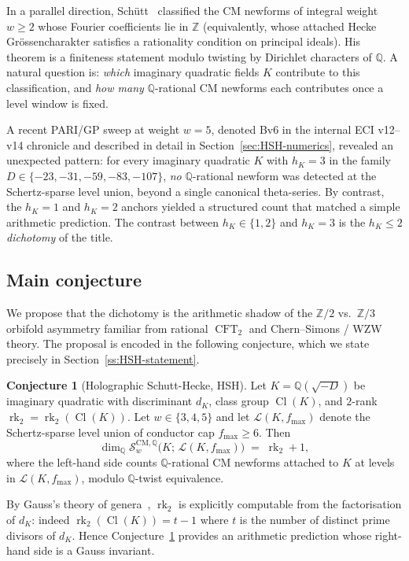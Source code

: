 \documentclass[11pt,a4paper]{amsart}
\theoremstyle{definition}
\newtheorem{conjecture}[theorem]{Conjecture}
\DeclareMathOperator{\Cl}{Cl}
\DeclareMathOperator{\rk}{rk}
\DeclareMathOperator{\CFT}{CFT}
\newcommand{\Q}{\mathbb{Q}}
\newcommand{\Z}{\mathbb{Z}}
\newcommand{\Lcal}{\mathcal{L}}
\newcommand{\Scal}{\mathcal{S}}
\newcommand{\rktwo}{\rk_{2}}
\begin{document}
In a parallel direction, Sch\"utt~\cite{Schutt2009} classified the CM newforms of integral
weight $w \ge 2$ whose Fourier coefficients lie in $\Z$ (equivalently, whose attached
Hecke Gr\"ossencharakter satisfies a rationality condition on principal ideals). His
theorem is a finiteness statement modulo twisting by Dirichlet characters of $\Q$.
A natural question is: \emph{which} imaginary quadratic fields $K$ contribute to this
classification, and \emph{how many} $\Q$-rational CM newforms each contributes once a
level window is fixed.

A recent PARI/GP sweep at weight $w = 5$, denoted Bv6 in the internal ECI v12--v14
chronicle and described in detail in Section~\ref{sec:HSH-numerics}, revealed an
unexpected pattern: for every imaginary quadratic $K$ with $h_K = 3$ in the family
$D \in \{-23,-31,-59,-83,-107\}$, \emph{no} $\Q$-rational newform was detected at the
Schertz-sparse level union, beyond a single canonical theta-series. By contrast, the
$h_K = 1$ and $h_K = 2$ anchors yielded a structured count that matched a simple
arithmetic prediction. The contrast between $h_K \in \{1,2\}$ and $h_K = 3$ is the
\emph{$h_K \le 2$ dichotomy} of the title.

\subsection{Main conjecture}\label{ss:intro-main}

We propose that the dichotomy is the arithmetic shadow of the $\Z/2$ vs.\ $\Z/3$ orbifold
asymmetry familiar from rational $\CFT_2$ and Chern--Simons / WZW theory. The proposal
is encoded in the following conjecture, which we state precisely in
Section~\ref{ss:HSH-statement}.

\begin{conjecture}[Holographic Schutt-Hecke, HSH]\label{conj:HSH-intro}
Let $K = \Q(\sqrt{-D})$ be imaginary quadratic with discriminant $d_K$, class group
$\Cl(K)$, and $2$-rank $\rktwo = \rktwo(\Cl(K))$. Let $w \in \{3,4,5\}$ and let
$\Lcal(K, f_{\max})$ denote the Schertz-sparse level union of conductor cap $f_{\max} \ge 6$.
Then
\[
  \dim_{\Q} \Scal_w^{\mathrm{CM},\Q}\bigl(K;\,\Lcal(K, f_{\max})\bigr) \;=\; \rktwo + 1,
\]
where the left-hand side counts $\Q$-rational CM newforms attached to $K$ at levels in
$\Lcal(K, f_{\max})$, modulo $\Q$-twist equivalence.
\end{conjecture}

By Gauss's theory of genera~\cite{Gauss1801}, $\rktwo$ is explicitly computable from the
factorisation of $d_K$: indeed $\rktwo(\Cl(K)) = t - 1$ where $t$ is the number of distinct
prime divisors of $d_K$. Hence Conjecture~\ref{conj:HSH-intro} provides an arithmetic
prediction whose right-hand side is a Gauss invariant.
\end{document}
